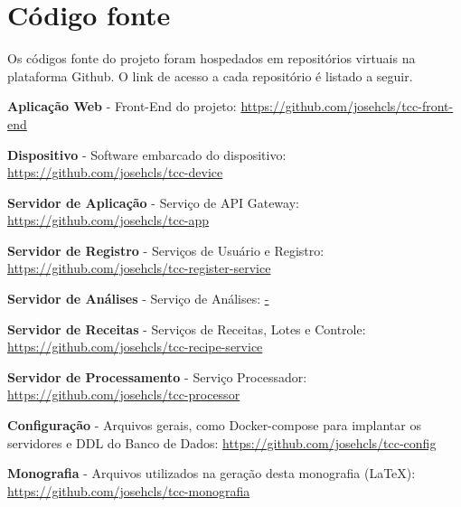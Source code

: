 \chapter{Código fonte}

Os códigos fonte do projeto foram hospedados em repositórios virtuais na plataforma Github. O link de acesso a cada repositório é listado a seguir.



\textbf{Aplicação Web} - Front-End do projeto: \url{https://github.com/josehcls/tcc-front-end}


\textbf{Dispositivo} - Software embarcado do dispositivo: \url{https://github.com/josehcls/tcc-device}


\textbf{Servidor de Aplicação} - Serviço de API Gateway: \url{https://github.com/josehcls/tcc-app}


\textbf{Servidor de Registro} - Serviços de Usuário e Registro: \url{https://github.com/josehcls/tcc-register-service}


\textbf{Servidor de Análises} - Serviço de Análises: \url{-}


\textbf{Servidor de Receitas} - Serviços de Receitas, Lotes e Controle: \url{https://github.com/josehcls/tcc-recipe-service}


\textbf{Servidor de Processamento} - Serviço Processador: \url{https://github.com/josehcls/tcc-processor}


\textbf{Configuração} - Arquivos gerais, como Docker-compose para implantar os servidores e DDL do Banco de Dados: \url{https://github.com/josehcls/tcc-config}


\textbf{Monografia} - Arquivos utilizados na geração desta monografia (LaTeX): \url{https://github.com/josehcls/tcc-monografia}

